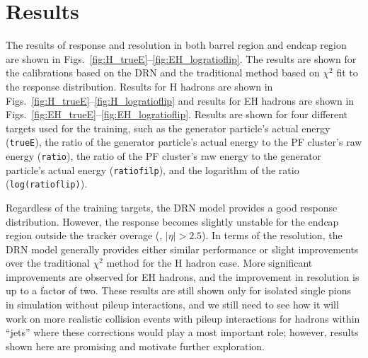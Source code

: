 \section{Results}
The results of response and resolution in both barrel region and endcap region are shown in Figs.~\ref{fig:H_trueE}--\ref{fig:EH_logratioflip}.
The results are shown for the calibrations based on the DRN and the traditional method based on $\chi^2$ fit to the response distribution.
Results for H hadrons are shown in Figs.~\ref{fig:H_trueE}--\ref{fig:H_logratioflip} and results for EH hadrons are shown in Figs.~\ref{fig:EH_trueE}--\ref{fig:EH_logratioflip}.
Results are shown for four different targets used for the training, such as the generator particle's actual energy ({\tt trueE}),
the ratio of the generator particle's actual energy to the PF cluster's raw energy ({\tt ratio}), the ratio of the PF cluster's raw energy to the generator particle's actual energy ({\tt ratiofilp}),
and the logarithm of the ratio ({\tt log(ratioflip)}).

Regardless of the training targets, the DRN model provides a good response distribution.
However, the response becomes slightly unstable for the endcap region outside the tracker overage (\ie, $|\eta|>2.5$).
In terms of the resolution, the DRN model generally provides either similar performance or slight improvements over the traditional $\chi^2$ method for the H hadron case.
More significant improvements are observed for EH hadrons, and the improvement in resolution is up to a factor of two.
These results are still shown only for isolated single pions in simulation without pileup interactions, and we still need to see how it will work on more realistic collision events
with pileup interactions for hadrons within ``jets'' where these corrections would play a most important role; however, results shown here are promising and motivate further exploration.













